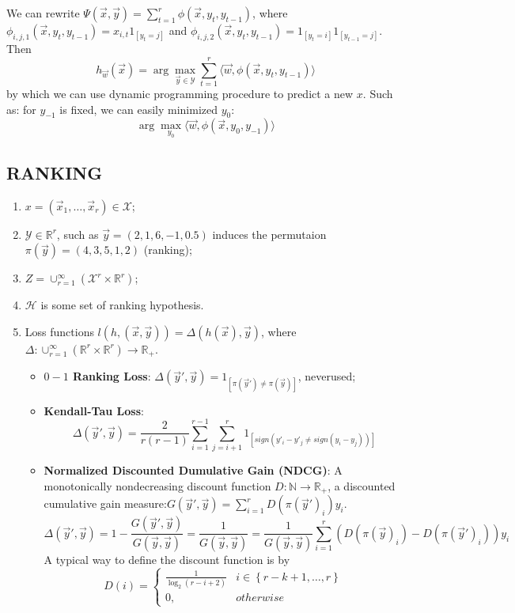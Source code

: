 We can rewrite $ \Psi(\vec{x}, \vec{y}) = \sum^{r}_{t=1} \phi(\vec{x}, y_t, y_{t-1}) $, where $ \phi_{i, j, 1} (\vec{x}, y_t, y_{t-1}) = x_{i,t} 1_{[y_t = j]} $ and $ \phi_{i, j, 2}(\vec{x}, y_t, y_{t-1}) = 1_{[y_t = i]} 1_{[y_{t-1} = j]} $.
Then 
\[h_{\vec{w}}(\vec{x}) = \arg\max_{\vec{y} \in \mathcal{Y}} \sum^{r}_{t=1} \langle \vec{w}, \phi(\vec{x}, y_t, y_{t-1}) \rangle \]
by which we can use dynamic programming procedure to predict a new $x$.
Such as: for $ y_{-1} $ is fixed, we can easily minimized $ y_0 $:
\[
    \arg\max_{y_0} \langle \vec{w}, \phi(\vec{x}, y_0, y_{-1}) \rangle
\]

\subsection{RANKING}%
\label{sub:ranking}

\begin{enumerate}
    \item $ x = (\vec{x}_1, \ldots, \vec{x}_r) \in \mathcal{X} $;
    \item $ \mathcal{Y} \in \mathbb{R}^{r} $, such as $ \vec{y} = (2, 1, 6, -1, 0.5) $ induces the permutaion $ \pi(\vec{y}) = (4, 3, 5, 1, 2) $ (ranking);
    \item $ Z = \cup^{\infty}_{r=1}(\mathcal{X}^r \times \mathbb{R}^r) $;
    \item $ \mathcal{H} $ is some set of ranking hypothesis.
    \item Loss functions $ l(h, (\vec{x}, \vec{y})) = \Delta(h(\vec{x}), \vec{y}) $, where $ \Delta: \cup^{\infty}_{r=1}(\mathbb{R}^{r} \times \mathbb{R}^{r}) \rightarrow \mathbb{R}_{+} $.
        \begin{itemize}
            \item \textbf{$0-1$ Ranking Loss}: $ \Delta(\vec{y}', \vec{y}) = 1_{[\pi(\vec{y}') \ne \pi(\vec{y})]} $, neverused;
            \item \textbf{Kendall-Tau Loss}:
                \[
                    \Delta(\vec{y}', \vec{y}) = \frac{2}{r(r-1)} \sum^{r-1}_{i=1} \sum^{r}_{j=i+1} 1_{[sign(y'_i - y'_j \ne sign(y_i - y_j))]}
                \]
            \item \textbf{Normalized Discounted Dumulative Gain (NDCG)}:
                A monotonically nondecreasing discount function $ D: \mathbb{N} \rightarrow \mathbb{R}_+ $, a discounted cumulative gain measure:$ G(\vec{y}', \vec{y}) = \sum^{r}_{i=1} D(\pi{(\vec{y}')}_i) y_i $.
                \[
                \Delta(\vec{y}', \vec{y}) = 1 - \frac{G(\vec{y}', \vec{y})}{G(\vec{y}, \vec{y})} = \frac{1}{G(\vec{y}, \vec{y})} = \frac{1}{G(\vec{y}, \vec{y})} \sum^{r}_{i=1} (D({\pi(\vec{y})}_i) - D({\pi(\vec{y}')}_i)) y_i 
                \]
                A typical way to define the discount function is by
                \[
                    D(i) =
                    \begin{cases}
                        \frac{1}{\log_2(r - i + 2)} & i \in \left\{ r - k + 1, \ldots, r \right\}\\
                        0,& otherwise
                    \end{cases}
                \]
        \end{itemize}
\end{enumerate}

